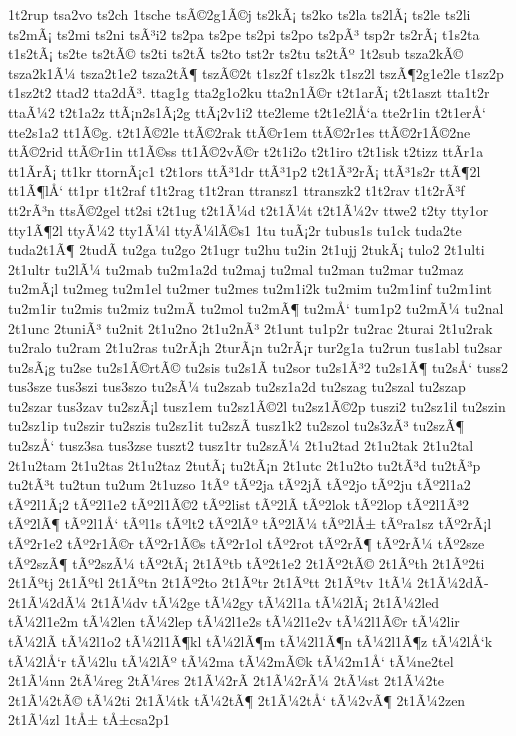 {1t2rup
tsa2vo
ts2ch
1tsche
tsÃ©2g1Ã©j
ts2kÃ¡
ts2ko
ts2la
ts2lÃ¡
ts2le
ts2li
ts2mÃ¡
ts2mi
ts2ni
tsÃ³i2
ts2pa
ts2pe
ts2pi
ts2po
ts2pÃ³
tsp2r
ts2rÃ¡
t1s2ta
t1s2tÃ¡
ts2te
ts2tÃ©
ts2ti
ts2tÃ­
ts2to
tst2r
ts2tu
ts2tÃº
1t2sub
tsza2kÃ©
tsza2k1Ã¼
tsza2t1e2
tsza2tÃ¶
tszÃ©2t
t1sz2f
t1sz2k
t1sz2l
tszÃ¶2g1e2le
t1sz2p
t1sz2t2
ttad2
tta2dÃ³.
ttag1g
tta2g1o2ku
tta2n1Ã©r
t2t1arÃ¡
t2t1aszt
tta1t2r
ttaÃ¼2
t2t1a2z
ttÃ¡n2s1Ã¡2g
ttÃ¡2v1i2
tte2leme
t2t1e2lÅ‘a
tte2r1in
t2t1erÅ‘
tte2s1a2
tt1Ã©g.
t2t1Ã©2le
ttÃ©2rak
ttÃ©r1em
ttÃ©2r1es
ttÃ©2r1Ã©2ne
ttÃ©2rid
ttÃ©r1in
tt1Ã©ss
tt1Ã©2vÃ©r
t2t1i2o
t2t1iro
t2t1isk
t2tizz
ttÃ­r1a
tt1Ã­rÃ¡
tt1kr
ttornÃ¡c1
t2t1ors
ttÃ³1dr
ttÃ³1p2
t2t1Ã³2rÃ¡
ttÃ³1s2r
ttÃ¶2l
tt1Ã¶lÅ‘
tt1pr
t1t2raf
t1t2rag
t1t2ran
ttransz1
ttranszk2
t1t2rav
t1t2rÃ³f
tt2rÃ³n
ttsÃ©2gel
tt2si
t2t1ug
t2t1Ã¼d
t2t1Ã¼t
t2t1Ã¼2v
ttwe2
t2ty
tty1or
tty1Ã¶2l
ttyÃ¼2
tty1Ã¼l
ttyÃ¼lÃ©s1
1tu
tuÃ¡2r
tubus1s
tu1ck
tuda2te
tuda2t1Ã¶
2tudÃ­
tu2ga
tu2go
2t1ugr
tu2hu
tu2in
2t1ujj
2tukÃ¡
tulo2
2t1ulti
2t1ultr
tu2lÃ¼
tu2mab
tu2m1a2d
tu2maj
tu2mal
tu2man
tu2mar
tu2maz
tu2mÃ¡l
tu2meg
tu2m1el
tu2mer
tu2mes
tu2m1i2k
tu2mim
tu2m1inf
tu2m1int
tu2m1ir
tu2mis
tu2miz
tu2mÃ­
tu2mol
tu2mÃ¶
tu2mÅ‘
tum1p2
tu2mÃ¼
tu2nal
2t1unc
2tuniÃ³
tu2nit
2t1u2no
2t1u2nÃ³
2t1unt
tu1p2r
tu2rac
2turai
2t1u2rak
tu2ralo
tu2ram
2t1u2ras
tu2rÃ¡h
2turÃ¡n
tu2rÃ¡r
tur2g1a
tu2run
tus1abl
tu2sar
tu2sÃ¡g
tu2se
tu2s1Ã©rtÃ©
tu2sis
tu2s1Ã­
tu2sor
tu2s1Ã³2
tu2s1Ã¶
tu2sÅ‘
tuss2
tus3sze
tus3szi
tus3szo
tu2sÃ¼
tu2szab
tu2sz1a2d
tu2szag
tu2szal
tu2szap
tu2szar
tus3zav
tu2szÃ¡l
tusz1em
tu2sz1Ã©2l
tu2sz1Ã©2p
tuszi2
tu2sz1il
tu2szin
tu2sz1ip
tu2szir
tu2szis
tu2sz1it
tu2szÃ­
tusz1k2
tu2szol
tu2s3zÃ³
tu2szÃ¶
tu2szÅ‘
tusz3sa
tus3zse
tuszt2
tusz1tr
tu2szÃ¼
2t1u2tad
2t1u2tak
2t1u2tal
2t1u2tam
2t1u2tas
2t1u2taz
2tutÃ¡
tu2tÃ¡n
2t1utc
2t1u2to
tu2tÃ³d
tu2tÃ³p
tu2tÃ³t
tu2tun
tu2um
2t1uzso
1tÃº
tÃº2ja
tÃº2jÃ­
tÃº2jo
tÃº2ju
tÃº2l1a2
tÃº2l1Ã¡2
tÃº2l1e2
tÃº2l1Ã©2
tÃº2list
tÃº2lÃ­
tÃº2lok
tÃº2lop
tÃº2l1Ã³2
tÃº2lÃ¶
tÃº2l1Å‘
tÃºl1s
tÃºlt2
tÃº2lÃº
tÃº2lÃ¼
tÃº2lÅ±
tÃºra1sz
tÃº2rÃ¡l
tÃº2r1e2
tÃº2r1Ã©r
tÃº2r1Ã©s
tÃº2r1ol
tÃº2rot
tÃº2rÃ¶
tÃº2rÃ¼
tÃº2sze
tÃº2szÃ¶
tÃº2szÃ¼
tÃº2tÃ¡
2t1Ãºtb
tÃº2t1e2
2t1Ãº2tÃ©
2t1Ãºth
2t1Ãº2ti
2t1Ãºtj
2t1Ãºtl
2t1Ãºtn
2t1Ãº2to
2t1Ãºtr
2t1Ãºtt
2t1Ãºtv
1tÃ¼
2t1Ã¼2dÃ­
2t1Ã¼2dÃ¼
2t1Ã¼dv
tÃ¼2ge
tÃ¼2gy
tÃ¼2l1a
tÃ¼2lÃ¡
2t1Ã¼2led
tÃ¼2l1e2m
tÃ¼2len
tÃ¼2lep
tÃ¼2l1e2s
tÃ¼2l1e2v
tÃ¼2l1Ã©r
tÃ¼2lir
tÃ¼2lÃ­
tÃ¼2l1o2
tÃ¼2l1Ã¶kl
tÃ¼2lÃ¶m
tÃ¼2l1Ã¶n
tÃ¼2l1Ã¶z
tÃ¼2lÅ‘k
tÃ¼2lÅ‘r
tÃ¼2lu
tÃ¼2lÃº
tÃ¼2ma
tÃ¼2mÃ©k
tÃ¼2m1Å‘
tÃ¼ne2tel
2t1Ã¼nn
2tÃ¼reg
2tÃ¼res
2t1Ã¼2rÃ­
2t1Ã¼2rÃ¼
2tÃ¼st
2t1Ã¼2te
2t1Ã¼2tÃ©
tÃ¼2ti
2t1Ã¼tk
tÃ¼2tÃ¶
2t1Ã¼2tÅ‘
tÃ¼2vÃ¶
2t1Ã¼2zen
2t1Ã¼zl
1tÅ±
tÅ±csa2p1
}
